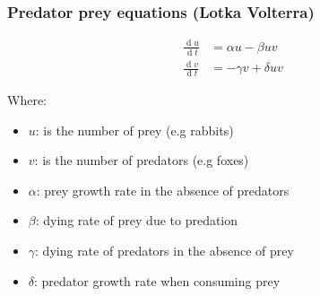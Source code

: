 \documentclass[pdf]{beamer}
\renewcommand{\d}[1]{\ensuremath{\operatorname{d}\!{#1}}} %
\begin{document}
\begin{frame}[fragile]
\frametitle{Predator prey equations (Lotka Volterra)}


\begin{align*}
 \frac{\d{u}}{\d{t}} &= \alpha u - \beta uv\\[1em]
\frac{\d{v}}{\d{t}} &= -\gamma v + \delta uv 
\end{align*}





Where:

\begin{itemize}
\item $u$: is the number of prey (e.g rabbits)
\item $v$: is the number of predators (e.g foxes)
\item $\alpha$: prey growth rate in the absence of predators
\item $\beta$: dying rate of prey due to predation
\item $\gamma$: dying rate of predators in the absence of prey
\item $\delta$: predator growth rate when consuming prey
\end{itemize}


\end{frame}
\end{document}
